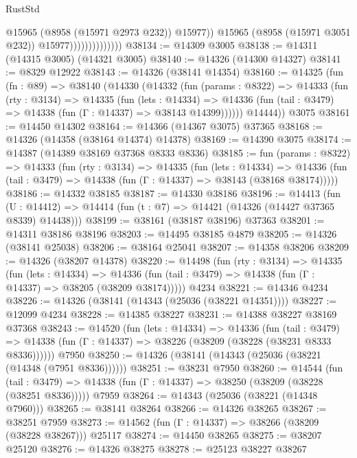 \begin{lexlean}{RustStd}
\begin{coremodule}
                                    @15965
                                    (@8958 (@15971 @2973 @232))
                                    @15977))
                                @15965
                                (@8958 (@15971 @3051 @232))
                                @15977))))))))))))))
@38134 := @14309 @3005
@38138 := @14311 (@14315 @3005) (@14321 @3005)
@38140 := @14326 (@14300 @14327)
@38141 := @8329 @12922
@38143 := @14326 (@38141 @14354)
@38160 := @14325
    (fun (fn : @89) =>
    @38140
      (@14330
        (@14332
          (fun (params : @8322) =>
          @14333
            (fun (rty : @3134) =>
            @14335
              (fun (lets : @14334) =>
              @14336 (fun (tail : @3479) => @14338 (fun (Γ : @14337) => @38143 @14399))))))
        @14444))
    @3075
@38161 := @14450 @14302
@38164 := @14366 (@14367 @3075) @37365
@38168 := @14326 (@14358 (@38164 @14374) @14378)
@38169 := @14390 @3075
@38174 := @14387 (@14389 @38169 @37368 @8333 @8336)
@38185 := fun (params : @8322) =>
  @14333
    (fun (rty : @3134) =>
    @14335
      (fun (lets : @14334) =>
      @14336 (fun (tail : @3479) => @14338 (fun (Γ : @14337) => @38143 (@38168 @38174)))))
@38186 := @14332 @38185
@38187 := @14330 @38186
@38196 := @14413
    (fun (U : @14412) => @14414 (fun (t : @7) => @14421 (@14326 (@14427 @37365 @8339) @14438)))
@38199 := @38161 (@38187 @38196) @37363
@38201 := @14311 @38186 @38196
@38203 := @14495 @38185 @4879
@38205 := @14326 (@38141 @25038)
@38206 := @38164 @25041
@38207 := @14358 @38206
@38209 := @14326 (@38207 @14378)
@38220 := @14498
    (fun (rty : @3134) =>
    @14335
      (fun (lets : @14334) =>
      @14336 (fun (tail : @3479) => @14338 (fun (Γ : @14337) => @38205 (@38209 @38174)))))
    @4234
@38221 := @14346 @4234
@38226 := @14326 (@38141 (@14343 (@25036 (@38221 @14351))))
@38227 := @12099 @4234
@38228 := @14385 @38227
@38231 := @14388 @38227 @38169 @37368
@38243 := @14520
    (fun (lets : @14334) =>
    @14336
      (fun (tail : @3479) =>
      @14338 (fun (Γ : @14337) => @38226 (@38209 (@38228 (@38231 @8333 @8336))))))
    @7950
@38250 := @14326 (@38141 (@14343 (@25036 (@38221 (@14348 (@7951 @8336))))))
@38251 := @38231 @7950
@38260 := @14544
    (fun (tail : @3479) => @14338 (fun (Γ : @14337) => @38250 (@38209 (@38228 (@38251 @8336)))))
    @7959
@38264 := @14343 (@25036 (@38221 (@14348 @7960)))
@38265 := @38141 @38264
@38266 := @14326 @38265
@38267 := @38251 @7959
@38273 := @14562 (fun (Γ : @14337) => @38266 (@38209 (@38228 @38267))) @25117
@38274 := @14450 @38265
@38275 := @38207 @25120
@38276 := @14326 @38275
@38278 := @25123 @38227 @38267

\end{coremodule}
\end{lexlean}

